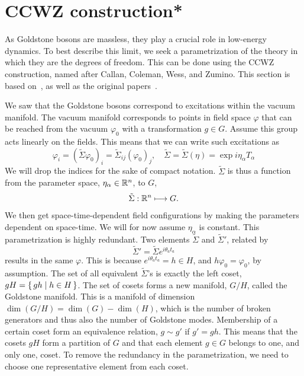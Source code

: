 \section{CCWZ construction*}
\label{seciton:ccwz construction}

As Goldstone bosons are massless, they play a crucial role in low-energy dynamics.
To best describe this limit, we seek a parametrization of the theory in which they are the degrees of freedom.
This can be done using the CCWZ construction, named after Callan, Coleman, Wess, and Zumino.
This section is based on~\autocite{morrisonColemanCallanWessZuminoConstruction2017,panicoCompositeNambuGoldstoneHiggs2016,weinbergQuantumTheoryFields1996,pichEffectiveFieldTheory2020}, as well as the original papers~\autocite{callanStructurePhenomenologicalLagrangians1969,colemanStructurePhenomenologicalLagrangians1969}.


We saw that the Goldstone bosons correspond to excitations within the vacuum manifold.
The vacuum manifold corresponds to points in field space $\varphi$ that can be reached from the vacuum $\varphi_0$ with a transformation $g \in G$.
Assume this group acts linearly on the fields.
This means that we can write such excitations as
\begin{equation}
    \varphi_i = (\tilde\Sigma \varphi_0)_{i} = \tilde \Sigma_{ij} (\varphi_0)_j, 
    \quad \tilde \Sigma = \tilde \Sigma(\eta) = \exp{i \eta_\alpha T_\alpha}
\end{equation}
%
We will drop the indices for the sake of compact notation.
$\tilde \Sigma$ is thus a function from the parameter space, $\eta_\alpha \in \mathbb{R}^n$, to $G$,
\begin{align}
    \tilde \Sigma: \mathbb{R}^n \longmapsto G.
\end{align}
%
We then get space-time-dependent field configurations by making the parameters dependent on space-time.
We will for now assume $\eta_\alpha$ is constant.
This parametrization is highly redundant.
Two elements $\tilde\Sigma$ and $\tilde\Sigma'$, related by
\begin{equation}
    \tilde \Sigma' = \tilde\Sigma e^{i \theta_a t_a}
\end{equation}
%
results in the same $\varphi$.
This is because  $e^{i \theta_a t_a} = h \in H$, and $h \varphi_0 = \varphi_0$, by assumption.
The set of all equivalent $\tilde \Sigma$'s is exactly the left coset, $gH = \left\{\, gh \mid  h \in H \,\right\}$.
The set of cosets forms a new manifold, $G / H$, called the Goldstone manifold.
This is a manifold of dimension $\dim(G/H) = \dim(G) - \dim(H)$, which is the number of broken generators and thus also the number of Goldstone modes.
Membership of a certain coset form an equivalence relation, $g \sim g'$ if $g' = gh$.
This means that the cosets $gH$ form a partition of $G$ and that each element $g \in G$ belongs to one, and only one, coset.
To remove the redundancy in the parametrization, we need to choose one representative element from each coset.

